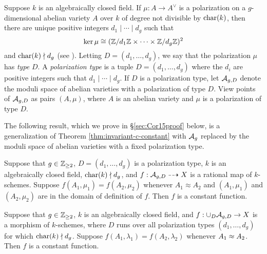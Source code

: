 \documentclass{amsart}
\begin{document}
Suppose $k$ is an algebraically closed field. If $\mu: A \to A^\vee$ is a polarization on a $g$-dimensional abelian variety $A$ over $k$ of degree not divisible by $\operatorname{char}(k)$, then there are unique positive integers $d_1 \mid \cdots \mid d_g$ such that
\[
  \ker \mu \cong (\mathbb{Z}/d_1\mathbb{Z} \times \cdots \times \mathbb{Z}/d_g\mathbb{Z})^2
\]
and $\operatorname{char}(k) \nmid d_g$ (see \cite[Theorem 1 et seq.]{mumford1966}). Letting $D = (d_1, \ldots, d_g)$, we say that the polarization $\mu$ has \emph{type} $D$.
A \emph{polarization type} is a tuple ${D} = (d_1, \ldots, d_g)$ where the $d_i$ are positive integers such that $d_1 \mid \cdots \mid d_g$. If $D$ is a polarization type, let $\mathcal{A}_{g,{D}}$ denote the moduli space of abelian varieties with a polarization of type ${D}$. View points of $\mathcal{A}_{g,{D}}$ as pairs $(A,\mu)$, where $A$ is an abelian variety and $\mu$ is a polarization of type ${D}$.

The following result, which we prove in \S\ref{sec:Cor15proof} below, is a generalization of Theorem \ref{thm:invariant-c-constant} with $\mathcal{A}_g$ replaced by the moduli space of  abelian varieties with a fixed %
polarization type.

\begin{corollary}\label{cor:agpol}
  Suppose that $g \in \mathbb{Z}_{\geq 2}$, ${D} = (d_1, \ldots, d_g)$ is a polarization type, $k$ is an algebraically closed field, $\operatorname{char}(k) \nmid d_g$, and  $f: \mathcal{A}_{g,{D}} \dashrightarrow X$ is a rational map of $k$-schemes. Suppose $f(A_1, \mu_1) = f(A_2, \mu_2)$ whenever $A_1 \approx A_2$ and $(A_1,\mu_1)$ and $(A_2,\mu_2)$ are in the domain of definition of $f$. Then $f$ is a constant function.
\end{corollary}

\begin{corollary}
\label{cor:alldcor}
  Suppose that $g\in\mathbb{Z}_{\ge 2}$, $k$ is an algebraically closed field, and $f: \cup_{D} \mathcal{A}_{g,{D}} \to X$ is a morphism of $k$-schemes, where $D$ runs over all polarization types $(d_1, \ldots, d_g)$ for which $\operatorname{char}(k) \nmid d_g$. Suppose $f(A_1,\lambda_1) = f(A_2,\lambda_2)$ whenever $A_1 \approx A_2$. Then $f$ is a constant function.
\end{corollary}

\end{document}

